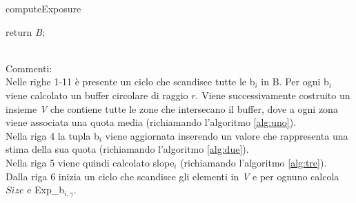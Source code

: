 \begin{algorithm}[H]
	

	\IncMargin{1em}
	\caption{computeExposure}
	\label{alg:quattro}
	\BlankLine
	
	\SetAlgoNoLine
	


	return \textit{B}; \\
	

\end{algorithm}
\mbox{}\\
Commenti:\\
Nelle righe 1-11 è presente un ciclo che scandisce tutte le b$_i$ in B.
Per ogni b$_i$ viene calcolato un buffer circolare di raggio $r$.  Viene successivamente costruito un insieme \textit{V}  che contiene tutte le zone che intersecano il buffer, dove a ogni zona viene associata una quota media (richiamando l'algoritmo \ref{alg:uno}).\\ 
Nella riga 4 la tupla b$_i$ viene aggiornata inserendo un valore che rappresenta una stima della sua quota (richiamando l'algoritmo \ref{alg:due}).\\
Nella riga 5 viene quindi calcolato slope$_i$ (richiamando l'algoritmo \ref{alg:tre}).\\
Dalla riga 6 inizia un ciclo che scandisce gli elementi in \textit{V} e per ognuno calcola $Size$ e Exp\_b$_{i,\gamma}$.\\
